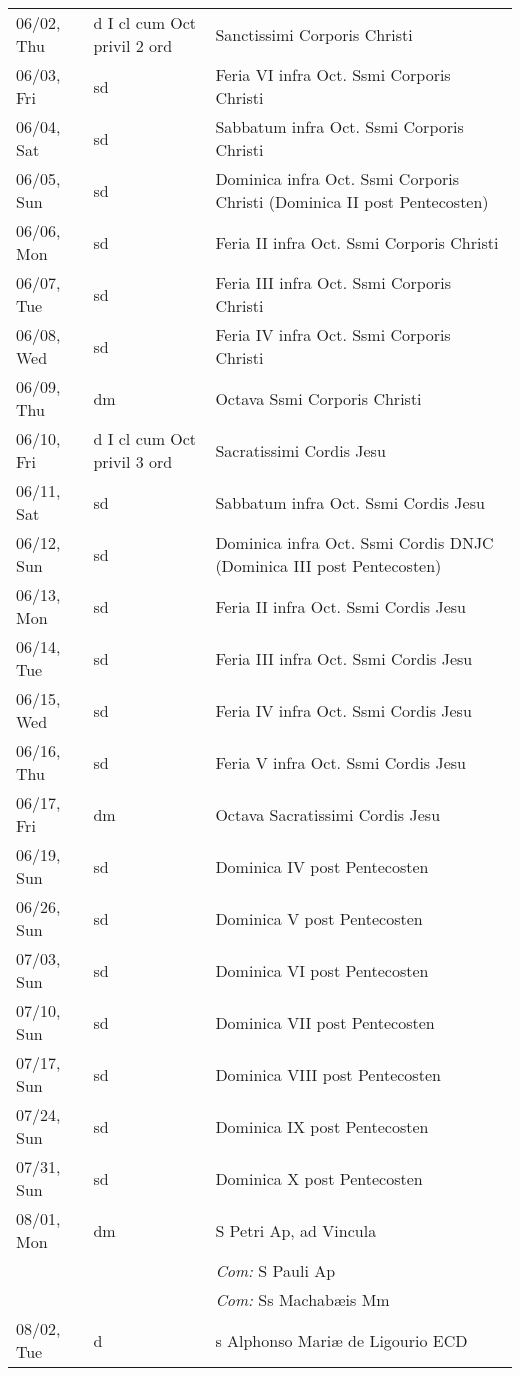 \documentclass[10pt]{article}
\begin{document}
\begin{longtable}{ l l l }
06/02, Thu & d I cl cum Oct privil 2 ord & Sanctissimi Corporis Christi\\
06/03, Fri & sd & Feria VI infra Oct. Ssmi Corporis Christi\\
06/04, Sat & sd & Sabbatum infra Oct. Ssmi Corporis Christi\\
06/05, Sun & sd & Dominica infra Oct. Ssmi Corporis Christi (Dominica II post Pentecosten)\\
06/06, Mon & sd & Feria II infra Oct. Ssmi Corporis Christi\\
06/07, Tue & sd & Feria III infra Oct. Ssmi Corporis Christi\\
06/08, Wed & sd & Feria IV infra Oct. Ssmi Corporis Christi\\
06/09, Thu & dm & Octava Ssmi Corporis Christi\\
06/10, Fri & d I cl cum Oct privil 3 ord & Sacratissimi Cordis Jesu\\
06/11, Sat & sd & Sabbatum infra Oct. Ssmi Cordis Jesu\\
06/12, Sun & sd & Dominica infra Oct. Ssmi Cordis DNJC (Dominica III post Pentecosten)\\
06/13, Mon & sd & Feria II infra Oct. Ssmi Cordis Jesu\\
06/14, Tue & sd & Feria III infra Oct. Ssmi Cordis Jesu\\
06/15, Wed & sd & Feria IV infra Oct. Ssmi Cordis Jesu\\
06/16, Thu & sd & Feria V infra Oct. Ssmi Cordis Jesu\\
06/17, Fri & dm & Octava Sacratissimi Cordis Jesu\\
06/19, Sun & sd & Dominica IV post Pentecosten\\
06/26, Sun & sd & Dominica V post Pentecosten\\
07/03, Sun & sd & Dominica VI post Pentecosten\\
07/10, Sun & sd & Dominica VII post Pentecosten\\
07/17, Sun & sd & Dominica VIII post Pentecosten\\
07/24, Sun & sd & Dominica IX post Pentecosten\\
07/31, Sun & sd & Dominica X post Pentecosten\\
08/01, Mon & dm & S Petri Ap, ad Vincula\\
 & & \textit{Com:} S Pauli Ap\\
 & & \textit{Com:} Ss Machabæis Mm\\
08/02, Tue & d & s Alphonso Mariæ de Ligourio ECD\\

\end{longtable}
\end{document}
